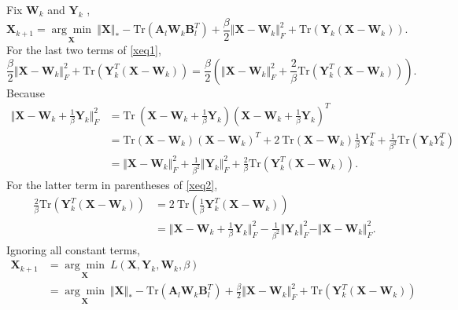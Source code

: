 \documentclass[fontset=windows]{article}
\begin{document}
{Fix $\mathbf W_k$ and $\mathbf Y_k$ ,
\begin{equation}
    \mathbf X_{k+1} =  \underset{\mathbf X}{\arg\min} \ \Vert\mathbf X \Vert_* - \text{Tr}(\mathbf A_l \mathbf W_k\mathbf B_l^T)    + \frac{\beta}{2}\Vert\mathbf X-\mathbf W_k \Vert_F^2 + \text{Tr}(\mathbf Y_k(\mathbf X-\mathbf W_k)).
    \label{xeq1}
\end{equation}
For the last two terms of \eqref{xeq1},
\begin{equation}
\frac{\beta}{2}\Vert\mathbf X-\mathbf W_k \Vert_F^2 + \text{Tr}(\mathbf Y_k^T(\mathbf X-\mathbf W_k))=  \frac{\beta}{2}\left( \Vert\mathbf X-\mathbf W_k \Vert_F^2 + \frac{2}{\beta} \text{Tr}(\mathbf Y_k^T(\mathbf X-\mathbf W_k)) \right).
\label{xeq2}
\end{equation}
Because
\begin{equation*}
    \begin{aligned}
        \Vert\mathbf X-\mathbf W_k+\frac{1}{\beta}\mathbf Y_k \Vert_F^2 & = \text{Tr} \ (\mathbf X-\mathbf W_k+\frac{1}{\beta}\mathbf Y_k)(\mathbf X-\mathbf W_k+\frac{1}{\beta}\mathbf Y_k)^T \\
        & = \text{Tr}(\mathbf X-\mathbf W_k)(\mathbf X-\mathbf W_k)^T + 2\ \text{Tr}(\mathbf X-\mathbf W_k)\frac{1}{\beta}\mathbf Y_k^T + \frac{1}{\beta^2}\text{Tr} (\mathbf Y_k Y_k^T) \\
        & = \Vert\mathbf X-\mathbf W_k \Vert_F^2 + \frac{1}{\beta^2}\Vert\mathbf Y_k \Vert_F^2 + \frac{2}{\beta}\text{Tr}(\mathbf Y_k^T(\mathbf X-\mathbf W_k)).
    \end{aligned}
\end{equation*}
For the latter term in parentheses of \eqref{xeq2},
\begin{equation}
    \begin{aligned}
\frac{2}{\beta} \text{Tr}(\mathbf Y_k^T(\mathbf X-\mathbf W_k)) & =  2 \ \text{Tr}(\frac{1}{\beta}\mathbf Y_k^T(\mathbf X-\mathbf W_k)) \\
    & = \Vert\mathbf X-\mathbf W_k+\frac{1}{\beta}\mathbf Y_k \Vert_F^2 - \frac{1}{\beta^2}\Vert\mathbf Y_k \Vert_F^2 - \Vert\mathbf X-\mathbf W_k \Vert_F^2.
\end{aligned}
\end{equation}
Ignoring all constant terms, 
\begin{equation}
\begin{aligned}
    \mathbf X_{k+1} & =\underset{\mathbf X}{\arg\min}\ L(\mathbf X,\mathbf Y_k, \mathbf W_k,\beta) \\
    & =  \underset{\mathbf X}{\arg\min} \ \Vert\mathbf X \Vert_* - \text{Tr}(\mathbf A_l\mathbf W_k\mathbf B_l^T)    + \frac{\beta}{2}\Vert\mathbf X-\mathbf W_k \Vert_F^2 + \text{Tr}(\mathbf Y_k^T(\mathbf X-\mathbf W_k)) \\

\end{aligned}
\end{equation}}
\end{document}
